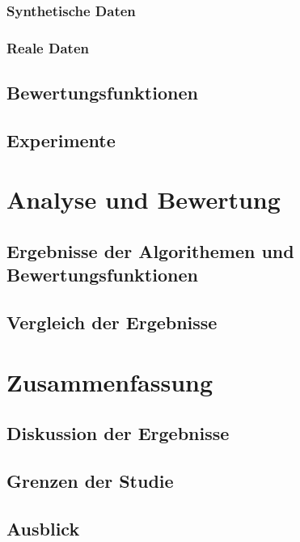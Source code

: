 \subsection{Synthetische Daten}\label{Synthetische Daten}

\subsection{Reale Daten}\label{Reale Daten}

\section{Bewertungsfunktionen}\label{Bewertungsfunktionen}

\section{Experimente}\label{Experimente}

\chapter{Analyse und Bewertung}

\section{Ergebnisse der Algorithemen und Bewertungsfunktionen}\label{Ergebnisse der Algorithemen und Bewertungsfunktionen}

\section{Vergleich der Ergebnisse}\label{Vergleich der Ergebnisse}

\chapter{Zusammenfassung}

\section{Diskussion der Ergebnisse}\label{Diskussion der Ergebnisse}

\section{Grenzen der Studie}\label{Grenzen der Studie}

\section{Ausblick}\label{Ausblick}